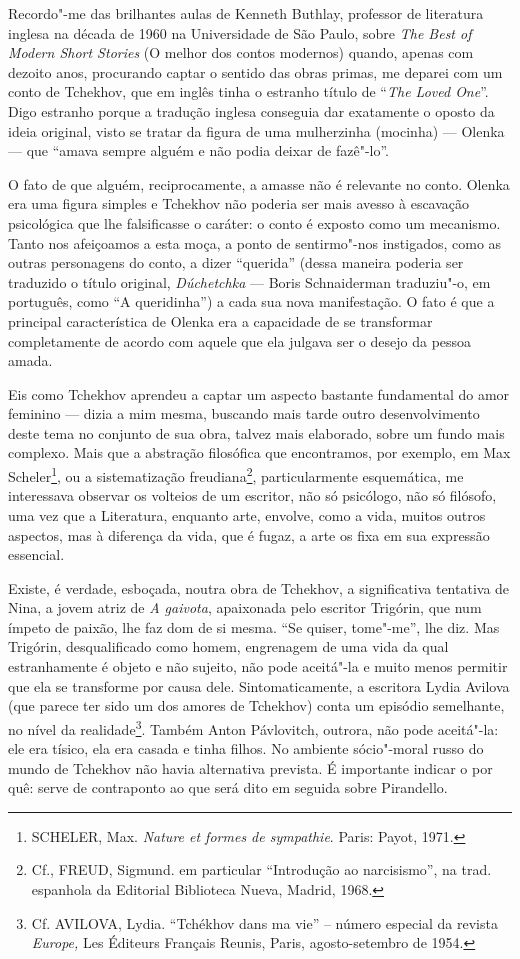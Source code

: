 Recordo"-me das brilhantes aulas de Kenneth Buthlay, professor de
literatura inglesa na década de 1960 na Universidade
de São Paulo, sobre \emph{The Best of Modern Short Stories} (O melhor dos
contos modernos) quando, apenas com dezoito anos, procurando captar o
sentido das obras primas, me deparei com um conto de Tchekhov, que em
inglês tinha o estranho título de ``\emph{The Loved One}''. Digo
estranho porque a tradução inglesa conseguia dar exatamente o oposto da
ideia original, visto se tratar da figura de uma mulherzinha (mocinha) ---
Olenka --- que ``amava sempre alguém e não podia deixar de fazê"-lo''.

O fato de que alguém, reciprocamente, a amasse não é relevante no conto.
Olenka era uma figura simples e Tchekhov não poderia ser mais avesso à
escavação psicológica que lhe falsificasse o caráter: o conto é exposto
como um mecanismo. Tanto nos afeiçoamos a esta moça, a ponto de
sentirmo"-nos instigados, como as outras personagens do conto, a dizer
``querida'' (dessa maneira poderia ser traduzido o título original,
\emph{Dúchetchka} --- Boris Schnaiderman traduziu"-o, em português, como ``A
queridinha'') a cada sua nova manifestação. O fato é que a principal
característica de Olenka era a capacidade de se transformar
completamente de acordo com aquele que ela julgava ser o desejo da
pessoa amada.

Eis como Tchekhov aprendeu a captar um aspecto bastante fundamental do
amor feminino --- dizia a mim mesma, buscando mais tarde outro
desenvolvimento deste tema no conjunto de sua obra, talvez mais
elaborado, sobre um fundo mais complexo. Mais que a abstração filosófica
que encontramos, por exemplo, em Max Scheler\footnote{SCHELER,
Max. \emph{Nature et formes de sympathie}. Paris: Payot, 1971.}, ou a sistematização
freudiana\footnote{Cf., FREUD, Sigmund. em particular
  ``Introdução ao narcisismo'', na trad. espanhola da Editorial
  Biblioteca Nueva, Madrid, 1968.}, particularmente esquemática, me interessava observar os
volteios de um escritor, não só psicólogo, não só filósofo, uma vez que
a Literatura, enquanto arte, envolve, como a vida, muitos outros
aspectos, mas à diferença da vida, que é fugaz, a arte os fixa em sua
expressão essencial.

Existe, é verdade, esboçada, noutra obra de Tchekhov, a significativa
tentativa de Nina, a jovem atriz de \emph{A gaivota}, apaixonada pelo
escritor Trigórin, que num ímpeto de paixão, lhe faz dom de si mesma.
``Se quiser, tome"-me'', lhe diz. Mas Trigórin, desqualificado como
homem, engrenagem de uma vida da qual estranhamente é objeto e não
sujeito, não pode aceitá"-la e muito menos permitir que ela se transforme
por causa dele. Sintomaticamente, a escritora Lydia Avilova (que parece
ter sido um dos amores de Tchekhov) conta um episódio semelhante, no
nível da realidade\footnote{Cf. AVILOVA, Lydia. ``Tchékhov dans ma vie''
  -- número especial da revista \emph{Europe,} Les Éditeurs Français
  Reunis, Paris, agosto-setembro de 1954.}. Também Anton Pávlovitch, outrora, não pode
aceitá"-la: ele era tísico, ela era casada e tinha filhos. No ambiente
sócio"-moral russo do mundo de Tchekhov não havia alternativa prevista. É
importante indicar o por quê: serve de contraponto ao que será dito em
seguida sobre Pirandello.

